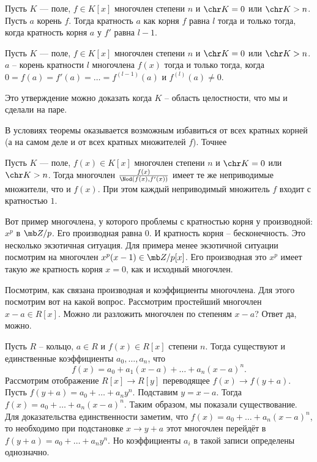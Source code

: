 \crl Пусть $K$ --- поле, $f\in K[x]$ многочлен степени $n$ и $\chr K = 0$ или $\chr K>n$. Пусть $a$ корень $f$. Тогда кратность  $a$ как корня $f$ равна $l$ тогда и только тогда, когда кратность корня $a$ у $f'$ равна $l-1$.
\ecrl

\crl Пусть $K$ --- поле, $f\in K[x]$ многочлен степени $n$ и $\chr K = 0$ или $\chr K>n$. $a$ -- корень кратности $l$ многочлена $f(x)$ тогда и только тогда, когда $0=f(a)=f'(a)=\dots=f^{(l-1)}(a)$ и $f^{(l)}(a)\neq 0$.
\ecrl

\rm Это утверждение можно доказать когда $K$ -- область целостности, что мы и сделали на паре.
\erm

В условиях теоремы оказывается возможным избавиться от всех кратных корней (а на самом деле и от всех кратных множителей $f$). Точнее

\crl Пусть $K$ --- поле, $f(x)\in K[x]$ многочлен степени $n$ и $\chr K = 0$ или $\chr K>n$. Тогда многочлен $\frac{f(x)}{\Nod(f(x),f'(x))}$ имеет те же неприводимые множители, что и $f(x)$. При этом каждый  неприводимый множитель $f$ входит с кратностью $1$.
\ecrl

 Вот пример многочлена, у которого проблемы с кратностью корня у производной: $x^{p}$ в $\mb Z/p$. Его производная равна 0. И кратность корня -- бесконечность. Это несколько экзотичная ситуация. Для примера менее экзотичной ситуации посмотрим на многочлен $x^p(x-1) \in \mb Z/p[x]$. Его производная это $x^p$ имеет такую же кратность корня $x=0$, как и исходный многочлен.



Посмотрим, как связана производная и коэффициенты многочлена. Для этого посмотрим вот на какой вопрос. Рассмотрим простейший многочлен $x-a \in R[x]$. Можно ли разложить многочлен по степеням $x-a$? Ответ да, можно.

\utv Пусть $R$ -- кольцо, $a\in R$  и $f(x)\in R[x]$ степени $n$. Тогда существуют и единственные коэффициенты $a_0,\dots, a_n$, что $$f(x)=a_0+a_1(x-a)+\dots+a_n(x-a)^n.$$
\proof Рассмотрим отображение $R[x] \to R[y]$ переводящее $f(x)\to f(y+a)$. Пусть $f(y+a)=a_0+\dots+a_n y^n$. Подставим $y=x-a$. Тогда $f(x)=a_0+\dots+a_n(x-a)^n$. Таким образом, мы показали существование.
Для доказательства единственности заметим, что $f(x)=a_0+\dots+a_n(x-a)^n$, то необходимо при подстановке $x\to y+a$ этот многочлен перейдёт в $f(y+a)=a_0+\dots+a_ny^n$. Но коэффициенты $a_i$ в такой записи определены однозначно.
\endproof
\eutv



